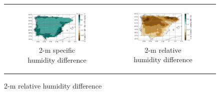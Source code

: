\begin{figure}[htbp]
\begin{tabular}{cc}
        \begin{subfigure}[b]{0.5\textwidth}
            \caption{2-m specific humidity difference}
            \includegraphics[width=\textwidth]{images/chap4/future/diffmap_q2m_presfut.png}
        \end{subfigure} &
        \begin{subfigure}[b]{0.5\textwidth}
            \caption{2-m relative humidity difference}
            \includegraphics[width=\textwidth]{images/chap4/future/diffmap_rh2m_presfut.png}
        \end{subfigure} \\


\end{tabular}
\end{figure}
